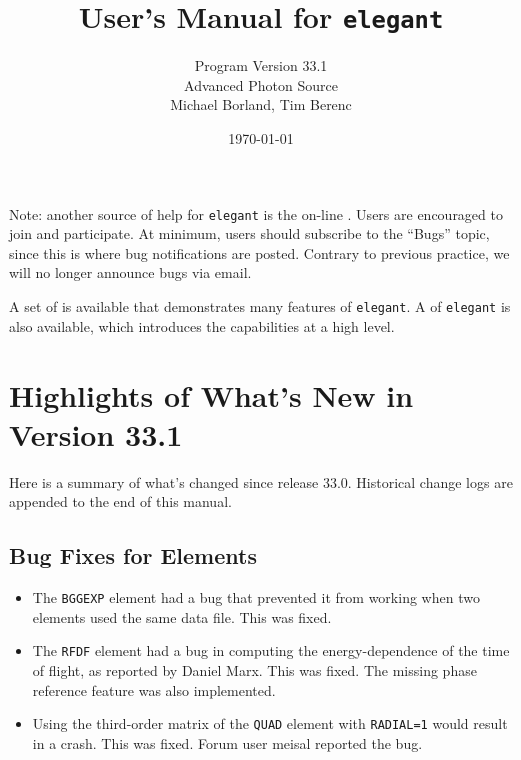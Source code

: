 \documentclass[11pt]{article}
\begin{document}
\title{User's Manual for {\tt elegant}}
\author{Program Version 33.1\\Advanced Photon Source\\Michael Borland, Tim Berenc\\ \date{\today}}
\maketitle

Note: another source of help for {\tt elegant} is the on-line
.
Users are encouraged to join and participate.  At minimum, users should subscribe to the ``Bugs'' topic,
since this is where bug notifications are posted.  Contrary to previous practice, we will no longer announce
bugs via email.

A set of  is
available that demonstrates many features of {\tt elegant}.  A  of {\tt elegant} is also available, which introduces the capabilities
at a high level.

\section{Highlights of What's New in Version 33.1}

Here is a summary of what's changed since release 33.0.
Historical change logs are appended to the end of this manual.

\subsection{Bug Fixes for Elements}

\begin{itemize}
\item The \verb|BGGEXP| element had a bug that prevented it from working when two elements
  used the same data file. This was fixed.
\item The \verb|RFDF| element had a bug in computing the energy-dependence of the time of flight,
  as reported by Daniel Marx. This was fixed. The missing phase reference feature was also implemented.
\item Using the third-order matrix of the \verb|QUAD| element with \verb|RADIAL=1| would result in a crash.
  This was fixed. Forum user meisal reported the bug.
\end{itemize}
\end{document}
